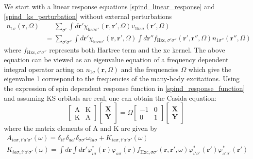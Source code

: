 We start with a linear response equations \eqref{spind_linear_response} and \eqref{spind_ks_perturbation} without external perturbations
\begin{align}
    n_{1\sigma}(\mathbf{r},\Omega) &= \sum_{\sigma'}\int d\mathbf{r'} \chi_{\text{ks}\sigma\sigma'}(\mathbf{r},\mathbf{r}',\Omega)v_{1\text{ks}\sigma}(\mathbf{r}',\Omega) \\
    &= \sum_{\sigma'\sigma''}\int d\mathbf{r'} \chi_{\text{ks}\sigma\sigma'}(\mathbf{r},\mathbf{r}',\Omega)\int d\mathbf{r}''f_{\text{Hxc},\sigma'\sigma''}(\mathbf{r}',\mathbf{r}'',\Omega)n_{1\sigma''}(\mathbf{r}'',\Omega)
\end{align}
where $f_{\text{Hxc},\sigma'\sigma''}$ represents both Hartree term and the xc kernel. The above equation can be viewed as an eigenvalue equation of a frequency dependent integral operator acting on $n_{1\sigma}(\mathbf{r},\Omega)$ and the frequencies $\Omega$ which give the eigenvalue 1 correspond to the frequencies of the many-body excitations. Using the expression of spin dependent response function in \eqref{spind_response_function} and assuming KS orbitals are real, one can obtain the Casida equation:
\begin{equation}\label{casida_eqn_AK}
    \begin{bmatrix}
    \text{A} & \text{K} \\
    \text{K} & \text{A}
    \end{bmatrix}
    \begin{bmatrix}
    \mathbf{X} \\
    \mathbf{Y} 
    \end{bmatrix} = \Omega 
    \begin{bmatrix}
    -1 & 0 \\
    0 & 1
    \end{bmatrix}
    \begin{bmatrix}
        \mathbf{X} \\
        \mathbf{Y} 
    \end{bmatrix}
\end{equation}
where the matrix elements of A and K are given by 
\begin{gather}
    A_{ia\sigma,i'a'\sigma'}(\omega) = \delta_{ii'}\delta_{aa'}\delta_{\sigma\sigma'}\omega_{ia\sigma} + K_{ia\sigma,i'a'\sigma'}(\omega) \\ 
    K_{ia\sigma,i'a'\sigma'}(\omega) = \int d\mathbf{r}\int d\mathbf{r}' \varphi_{i\sigma}^*(\mathbf{r})\varphi_{a\sigma}(\mathbf{r})f_{\text{Hxc},\sigma\sigma'}(\mathbf{r},\mathbf{r}',\omega)\varphi_{i'\sigma'}^*(\mathbf{r}')\varphi^*_{a'\sigma'}(\mathbf{r}')
\end{gather}
